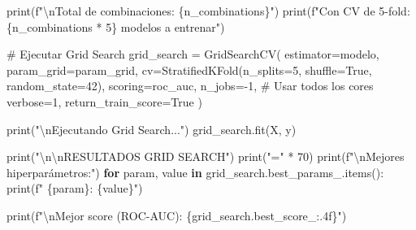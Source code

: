 \documentclass[
  doc,
  floatsintext,
  longtable,
  a4paper,
  nolmodern,
  notxfonts,
  notimes,
  12pt,
  colorlinks=true,linkcolor=blue,citecolor=blue,urlcolor=blue]{apa7}
\newenvironment{Shaded}{\begin{snugshade}}{\end{snugshade}}
\newcommand{\BuiltInTok}[1]{\textcolor[rgb]{0.00,0.23,0.31}{#1}}
\newcommand{\CharTok}[1]{\textcolor[rgb]{0.13,0.47,0.30}{#1}}
\newcommand{\CommentTok}[1]{\textcolor[rgb]{0.37,0.37,0.37}{#1}}
\newcommand{\ControlFlowTok}[1]{\textcolor[rgb]{0.00,0.23,0.31}{\textbf{#1}}}
\newcommand{\DecValTok}[1]{\textcolor[rgb]{0.68,0.00,0.00}{#1}}
\newcommand{\KeywordTok}[1]{\textcolor[rgb]{0.00,0.23,0.31}{\textbf{#1}}}
\newcommand{\NormalTok}[1]{\textcolor[rgb]{0.00,0.23,0.31}{#1}}
\newcommand{\OperatorTok}[1]{\textcolor[rgb]{0.37,0.37,0.37}{#1}}
\newcommand{\SpecialCharTok}[1]{\textcolor[rgb]{0.37,0.37,0.37}{#1}}
\newcommand{\SpecialStringTok}[1]{\textcolor[rgb]{0.13,0.47,0.30}{#1}}
\newcommand{\StringTok}[1]{\textcolor[rgb]{0.13,0.47,0.30}{#1}}
\newcommand{\VariableTok}[1]{\textcolor[rgb]{0.07,0.07,0.07}{#1}}
\begin{document}
\begin{Shaded}
\begin{Highlighting}[]
\BuiltInTok{print}\NormalTok{(}\SpecialStringTok{f"}\CharTok{\textbackslash{}n}\SpecialStringTok{Total de combinaciones: }\SpecialCharTok{\{}\NormalTok{n\_combinations}\SpecialCharTok{\}}\SpecialStringTok{"}\NormalTok{)}
\BuiltInTok{print}\NormalTok{(}\SpecialStringTok{f"Con CV de 5{-}fold: }\SpecialCharTok{\{}\NormalTok{n\_combinations }\OperatorTok{*} \DecValTok{5}\SpecialCharTok{\}}\SpecialStringTok{ modelos a entrenar"}\NormalTok{)}
\end{Highlighting}
\end{Shaded}

\begin{Shaded}
\begin{Highlighting}[]
\CommentTok{\# Ejecutar Grid Search}
\NormalTok{grid\_search }\OperatorTok{=}\NormalTok{ GridSearchCV(}
\NormalTok{    estimator}\OperatorTok{=}\NormalTok{modelo,}
\NormalTok{    param\_grid}\OperatorTok{=}\NormalTok{param\_grid,}
\NormalTok{    cv}\OperatorTok{=}\NormalTok{StratifiedKFold(n\_splits}\OperatorTok{=}\DecValTok{5}\NormalTok{, shuffle}\OperatorTok{=}\VariableTok{True}\NormalTok{, random\_state}\OperatorTok{=}\DecValTok{42}\NormalTok{),}
\NormalTok{    scoring}\OperatorTok{=}\StringTok{\textquotesingle{}roc\_auc\textquotesingle{}}\NormalTok{,}
\NormalTok{    n\_jobs}\OperatorTok{={-}}\DecValTok{1}\NormalTok{,  }\CommentTok{\# Usar todos los cores}
\NormalTok{    verbose}\OperatorTok{=}\DecValTok{1}\NormalTok{,}
\NormalTok{    return\_train\_score}\OperatorTok{=}\VariableTok{True}
\NormalTok{)}

\BuiltInTok{print}\NormalTok{(}\StringTok{"}\CharTok{\textbackslash{}n}\StringTok{Ejecutando Grid Search..."}\NormalTok{)}
\NormalTok{grid\_search.fit(X, y)}

\BuiltInTok{print}\NormalTok{(}\StringTok{"}\CharTok{\textbackslash{}n\textbackslash{}n}\StringTok{RESULTADOS GRID SEARCH"}\NormalTok{)}
\BuiltInTok{print}\NormalTok{(}\StringTok{"="} \OperatorTok{*} \DecValTok{70}\NormalTok{)}
\BuiltInTok{print}\NormalTok{(}\SpecialStringTok{f"}\CharTok{\textbackslash{}n}\SpecialStringTok{Mejores hiperparámetros:"}\NormalTok{)}
\ControlFlowTok{for}\NormalTok{ param, value }\KeywordTok{in}\NormalTok{ grid\_search.best\_params\_.items():}
    \BuiltInTok{print}\NormalTok{(}\SpecialStringTok{f"  }\SpecialCharTok{\{}\NormalTok{param}\SpecialCharTok{\}}\SpecialStringTok{: }\SpecialCharTok{\{}\NormalTok{value}\SpecialCharTok{\}}\SpecialStringTok{"}\NormalTok{)}

\BuiltInTok{print}\NormalTok{(}\SpecialStringTok{f"}\CharTok{\textbackslash{}n}\SpecialStringTok{Mejor score (ROC{-}AUC): }\SpecialCharTok{\{}\NormalTok{grid\_search}\SpecialCharTok{.}\NormalTok{best\_score\_}\SpecialCharTok{:.4f\}}\SpecialStringTok{"}\NormalTok{)}


\end{Highlighting}
\end{Shaded}
\end{document}
